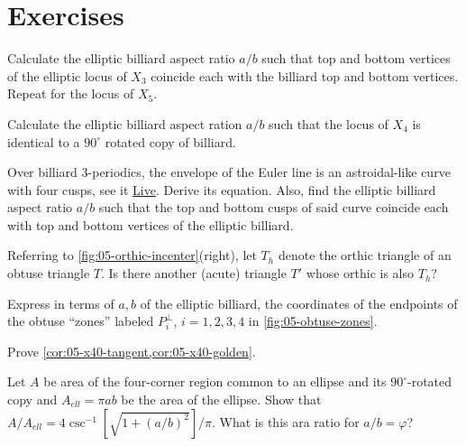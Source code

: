 \section{Exercises}

\begin{exercise}
Calculate the elliptic billiard aspect ratio $a/b$ such that top and bottom vertices of the elliptic locus of $X_3$ coincide each with the billiard top and bottom vertices. Repeat for the locus of $X_5$.
\end{exercise}

\begin{exercise}
Calculate the elliptic billiard aspect ration $a/b$ such that the locus of $X_4$ is identical to a $90^\circ$ rotated copy of billiard.
\end{exercise}

\begin{exercise}
Over billiard 3-periodics, the envelope of the Euler line is an astroidal-like curve with four cusps, see it \href{https://bit.ly/3yiCvrn}{Live}. Derive its equation. Also, find the elliptic billiard aspect ratio $a/b$ such that the top and bottom cusps of said curve coincide each with top and bottom vertices of the elliptic billiard.
\end{exercise}

\begin{exercise}
Referring to  \cref{fig:05-orthic-incenter}(right), let $T_h$ denote the orthic triangle of an obtuse triangle $T$. Is there another (acute) triangle $T'$ whose orthic is also $T_h$?
\end{exercise}

\begin{exercise}
Express in terms of $a,b$ of the elliptic billiard, the coordinates of the endpoints of the obtuse ``zones'' labeled $P_i^{\perp}$, $i=1,2,3,4$ in  \cref{fig:05-obtuse-zones}.
\end{exercise}

\begin{exercise}
Prove \cref{cor:05-x40-tangent,cor:05-x40-golden}.
\end{exercise}

\begin{exercise}
Let $A$ be area of the four-corner region common to an ellipse and its $90^\circ$-rotated copy and $A_{ell}=\pi a b$ be the area of the ellipse. Show that $A/A_{ell}=4 \csc^{-1}\left[{\sqrt{1 + (a/b)^2}}\right]/\pi$. What is this ara ratio for $a/b=\varphi$?
\end{exercise}

